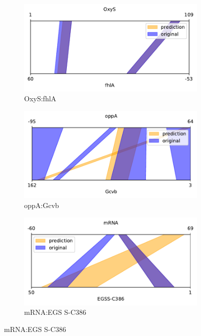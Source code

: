 \documentclass[twoside,a4paper]{report}
\begin{document}
	\begin{figure}
		\centering
		\begin{subfigure}{.5\textwidth}
			\centering
			\includegraphics[width=0.9\linewidth]{rricomparison1.pdf}
			\caption{OxyS:fhlA}
			\label{fig:rricomparison1}
		\end{subfigure}%
		\begin{subfigure}{.5\textwidth}
			\centering
			\includegraphics[width=.9\linewidth]{rricomparison6}
			\caption{oppA:Gcvb}
			\label{fig:rricomparison6}
		\end{subfigure}
		\begin{subfigure}{.5\textwidth}
			\centering
			\includegraphics[width=.9\linewidth]{rricomparison4}
			\caption{mRNA:EGS S-C386}
			\label{fig:rricomparison4}
		\end{subfigure}%

\end{figure}
\end{document}
